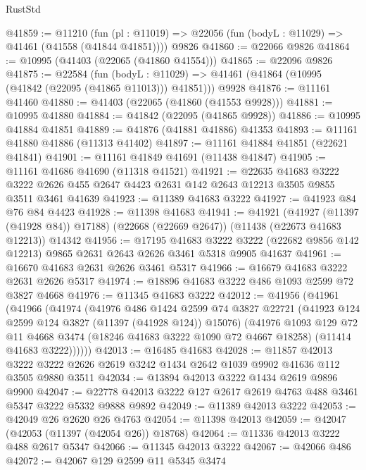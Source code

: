 \begin{lexlean}{RustStd}
\begin{coremodule}
@41859 := @11210
    (fun (pl : @11019) => @22056 (fun (bodyL : @11029) => @41461 (@41558 (@41844 @41851))))
    @9826
@41860 := @22066 @9826
@41864 := @10995 (@41403 (@22065 (@41860 @41554)))
@41865 := @22096 @9826
@41875 := @22584
    (fun (bodyL : @11029) => @41461 (@41864 (@10995 (@41842 (@22095 (@41865 @11013))) @41851)))
    @9928
@41876 := @11161 @41460
@41880 := @41403 (@22065 (@41860 (@41553 @9928)))
@41881 := @10995 @41880
@41884 := @41842 (@22095 (@41865 @9928))
@41886 := @10995 @41884 @41851
@41889 := @41876 (@41881 @41886) @41353
@41893 := @11161 @41880 @41886 (@11313 @41402)
@41897 := @11161 @41884 @41851 (@22621 @41841)
@41901 := @11161 @41849 @41691 (@11438 @41847)
@41905 := @11161 @41686 @41690 (@11318 @41521)
@41921 := @22635
    @41683
    @3222
    @3222
    @2626
    @455
    @2647
    @4423
    @2631
    @142
    @2643
    @12213
    @3505
    @9855
    @3511
    @3461
    @41639
@41923 := @11389 @41683 @3222
@41927 := @41923 @84 @76 @84 @4423
@41928 := @11398 @41683
@41941 := @41921
    (@41927 (@11397 (@41928 @84)) @17188)
    (@22668 (@22669 @2647))
    (@11438 (@22673 @41683 @12213))
    @14342
@41956 := @17195
    @41683
    @3222
    @3222
    (@22682 @9856 @142 @12213)
    @9865
    @2631
    @2643
    @2626
    @3461
    @5318
    @9905
    @41637
@41961 := @16670 @41683 @2631 @2626 @3461 @5317
@41966 := @16679 @41683 @3222 @2631 @2626 @5317
@41974 := @18896 @41683 @3222 @486 @1093 @2599 @72 @3827 @4668
@41976 := @11345 @41683 @3222
@42012 := @41956
    (@41961
      (@41966
        (@41974
          (@41976
            @486
            @1424
            @2599
            @74
            @3827
            @22721
            (@41923 @124 @2599 @124 @3827 (@11397 (@41928 @124)) @15076)
            (@41976
              @1093
              @129
              @72
              @11
              @4668
              @3474
              (@18246 @41683 @3222 @1090 @72 @4667 @18258)
              (@11414 @41683 @3222))))))
@42013 := @16485 @41683
@42028 := @11857
    @42013
    @3222
    @3222
    @2626
    @2619
    @3242
    @1434
    @2642
    @1039
    @9902
    @41636
    @112
    @3505
    @9880
    @3511
@42034 := @13894 @42013 @3222 @1434 @2619 @9896 @9900
@42047 := @22778 @42013 @3222 @127 @2617 @2619 @4763 @488 @3461 @5347 @3222 @5332 @9888 @9892
@42049 := @11389 @42013 @3222
@42053 := @42049 @26 @2620 @26 @4763
@42054 := @11398 @42013
@42059 := @42047 (@42053 (@11397 (@42054 @26)) @18768)
@42064 := @11336 @42013 @3222 @488 @2617 @5347
@42066 := @11345 @42013 @3222
@42067 := @42066 @486
@42072 := @42067 @129 @2599 @11 @5345 @3474

\end{coremodule}
\end{lexlean}
